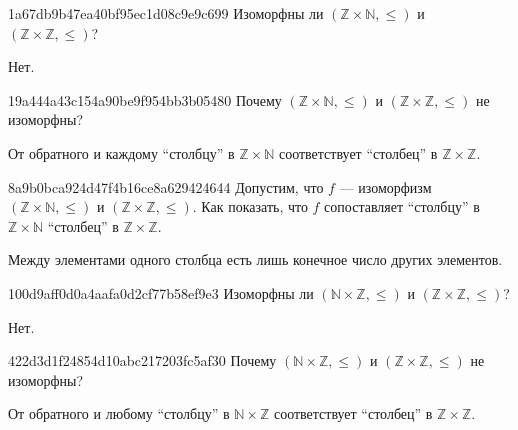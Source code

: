 \begin{note}{1a67db9b47ea40bf95ec1d08c9e9c699}
    Изоморфны ли \({ (\mathbb Z \times \mathbb N, \leqslant) }\) и \({ (\mathbb Z \times \mathbb Z, \leqslant) }\)?

    \begin{cloze}{1}
        Нет.
    \end{cloze}
\end{note}

\begin{note}{19a444a43c154a90be9f954bb3b05480}
    Почему \({ (\mathbb Z \times \mathbb N, \leqslant) }\) и \({ (\mathbb Z \times \mathbb Z, \leqslant) }\) не изоморфны?

    \begin{cloze}{1}
        От обратного и каждому ``столбцу'' в \({ \mathbb Z \times \mathbb N }\) соответствует ``столбец'' в \({ \mathbb Z \times \mathbb Z }\).
    \end{cloze}
\end{note}

\begin{note}{8a9b0bca924d47f4b16ce8a629424644}
    Допустим, что \({ f }\) --- изоморфизм \({ (\mathbb Z \times \mathbb N, \leqslant) }\) и \({ (\mathbb Z \times \mathbb Z, \leqslant) }\).
    Как показать, что \({ f }\) сопоставляет ``столбцу'' в \({ \mathbb Z \times \mathbb N }\) ``столбец'' в \({ \mathbb Z \times \mathbb Z }\).

    \begin{cloze}{1}
        Между элементами одного столбца есть лишь конечное число других элементов.
    \end{cloze}
\end{note}

\begin{note}{100d9aff0d0a4aafa0d2cf77b58ef9e3}
    Изоморфны ли \({ (\mathbb N \times \mathbb Z, \leqslant) }\) и \({ (\mathbb Z \times \mathbb Z, \leqslant) }\)?

    \begin{cloze}{1}
        Нет.
    \end{cloze}
\end{note}

\begin{note}{422d3d1f24854d10abc217203fc5af30}
    Почему \({ (\mathbb N \times \mathbb Z, \leqslant) }\) и \({ (\mathbb Z \times \mathbb Z, \leqslant) }\) не изоморфны?

    \begin{cloze}{1}
        От обратного и любому ``столбцу'' в \({ \mathbb N \times \mathbb Z }\) соответствует ``столбец'' в \({ \mathbb Z \times \mathbb Z }\).
    \end{cloze}
\end{note}

